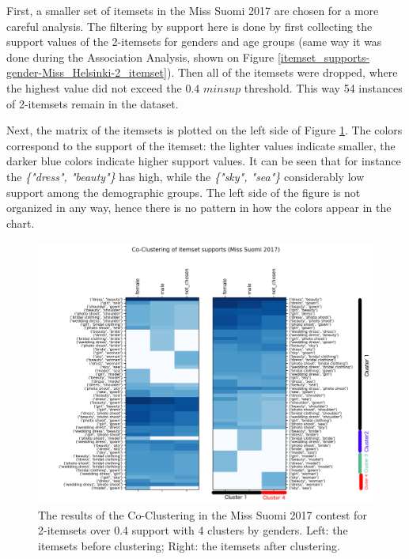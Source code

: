 First, a smaller set of itemsets in the Miss Suomi 2017 are chosen for a more careful analysis. The filtering by support here is done by first collecting the support values of the 2-itemsets for genders and age groups (same way it was done during the Association Analysis, shown on Figure \ref{itemset_supports-gender-Miss_Helsinki-2_itemset}). Then all of the itemsets were dropped, where the highest value did not exceed the $0.4$ $minsup$ threshold. This way 54 instances of 2-itemsets remain in the dataset.

Next, the matrix of the itemsets is plotted on the left side of Figure \ref{coclustering_miss-suomi-genders-2-itemsets-04_support}. The colors correspond to the support of the itemset: the lighter values indicate smaller, the darker blue colors indicate higher support values. It can be seen that for instance the \emph{\{"dress", "beauty"\}} has high, while the \emph{\{"sky", "sea"\}} considerably low support among the demographic groups. The left side of the figure is not organized in any way, hence there is no pattern in how the colors appear in the chart. 

\begin{figure}[h] 
    \begin{center}
        \includegraphics[width=1.0\textwidth]{Images/coclustering_miss-suomi-genders-2-itemsets-04_support.png}
        \caption{The results of the Co-Clustering in the Miss Suomi 2017 contest for 2-itemsets over 0.4 support with 4 clusters by genders. Left: the itemsets before clustering; Right: the itemsets after clustering.}
        \label{coclustering_miss-suomi-genders-2-itemsets-04_support}
    \end{center}
\end{figure}

